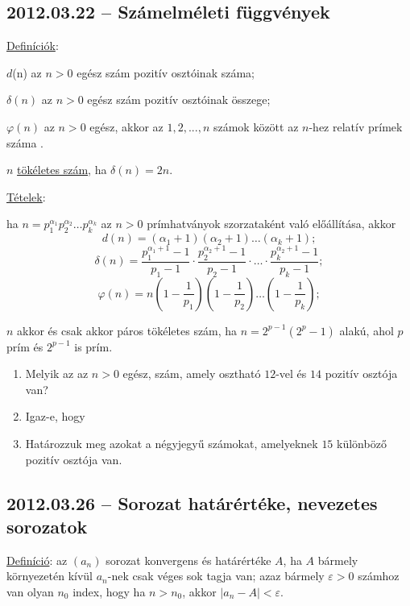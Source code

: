 \subsection*{2012.03.22 -- Számelméleti függvények}

\underline{Definíciók}:

$d$(n) az $n>0$ egész szám pozitív osztóinak száma;

$\delta (n)$ az $n>0$ egész szám pozitív osztóinak összege;

$\varphi(n)$ az $n>0$ egész, akkor az $1,2,...,n$ számok között az $n$-hez relatív prímek száma .

$n$ \underline{tökéletes szám}, ha $\delta (n)=2n$.

\noindent\underline{Tételek}:

ha $n=p_1^{\alpha_1}p_2^{\alpha_2}\ldots p_k^{\alpha_k}$ az $n>0$ prímhatványok szorzataként való előállítása, akkor
$$d(n)=(\alpha_1 +1)(\alpha_2 +1)\ldots(\alpha_k +1);$$
$$\delta(n)=\frac{p_1^{\alpha_1 +1}-1}{p_1 -1}\cdot\frac{p_2^{\alpha_2 +1}-1}{p_2 -1}\cdot\ldots\cdot\frac{p_k^
{\alpha_2 +1}-1}{p_k -1};$$
$$\varphi(n)=n\left(1-\frac{1}{p_1}\right)\left(1-\frac{1}{p_2}\right)\ldots\left(1-\frac{1}{p_k}\right);$$

$n$ akkor és csak akkor páros tökéletes szám, ha $n=2^{p-1}(2^p-1)$ alakú, ahol $p$ prím és $2^{p-1}$ is prím.

\begin{enumerate}
\item Melyik az az $n>0$ egész, szám, amely osztható $12$-vel és $14$ pozitív osztója van?
\item Igaz-e, hogy 
\item Határozzuk meg azokat a négyjegyű számokat, amelyeknek $15$ különböző pozitív osztója van. 
\end{enumerate}

\subsection*{2012.03.26 -- Sorozat határértéke, nevezetes sorozatok }
\underline{Definíció}: az $(a_n)$ sorozat konvergens és határértéke $A$, ha $A$ bármely környezetén kívül $a_n$-nek csak véges sok tagja van; azaz bármely $\varepsilon>0$ számhoz van olyan $n_0$ index, hogy ha $n>n_0$, akkor $|a_n-A|<\varepsilon$.

